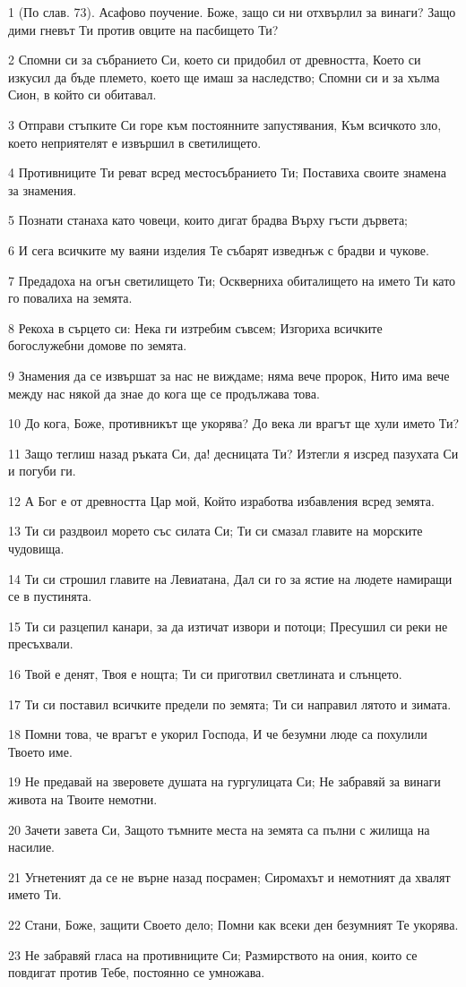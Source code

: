 \par 1 (По слав. 73). Асафово поучение. Боже, защо си ни отхвърлил за винаги? Защо дими гневът Ти против овците на пасбището Ти?
\par 2 Спомни си за събранието Си, което си придобил от древността, Което си изкусил да бъде племето, което ще имаш за наследство; Спомни си и за хълма Сион, в който си обитавал.
\par 3 Отправи стъпките Си горе към постоянните запустявания, Към всичкото зло, което неприятелят е извършил в светилището.
\par 4 Противниците Ти реват всред местосъбранието Ти; Поставиха своите знамена за знамения.
\par 5 Познати станаха като човеци, които дигат брадва Върху гъсти дървета;
\par 6 И сега всичките му ваяни изделия Те събарят изведнъж с брадви и чукове.
\par 7 Предадоха на огън светилището Ти; Оскверниха обиталището на името Ти като го повалиха на земята.
\par 8 Рекоха в сърцето си: Нека ги изтребим съвсем; Изгориха всичките богослужебни домове по земята.
\par 9 Знамения да се извършат за нас не виждаме; няма вече пророк, Нито има вече между нас някой да знае до кога ще се продължава това.
\par 10 До кога, Боже, противникът ще укорява? До века ли врагът ще хули името Ти?
\par 11 Защо теглиш назад ръката Си, да! десницата Ти? Изтегли я изсред пазухата Си и погуби ги.
\par 12 А Бог е от древността Цар мой, Който изработва избавления всред земята.
\par 13 Ти си раздвоил морето със силата Си; Ти си смазал главите на морските чудовища.
\par 14 Ти си строшил главите на Левиатана, Дал си го за ястие на людете намиращи се в пустинята.
\par 15 Ти си разцепил канари, за да изтичат извори и потоци; Пресушил си реки не пресъхвали.
\par 16 Твой е денят, Твоя е нощта; Ти си приготвил светлината и слънцето.
\par 17 Ти си поставил всичките предели по земята; Ти си направил лятото и зимата.
\par 18 Помни това, че врагът е укорил Господа, И че безумни люде са похулили Твоето име.
\par 19 Не предавай на зверовете душата на гургулицата Си; Не забравяй за винаги живота на Твоите немотни.
\par 20 Зачети завета Си, Защото тъмните места на земята са пълни с жилища на насилие.
\par 21 Угнетеният да се не върне назад посрамен; Сиромахът и немотният да хвалят името Ти.
\par 22 Стани, Боже, защити Своето дело; Помни как всеки ден безумният Те укорява.
\par 23 Не забравяй гласа на противниците Си; Размирството на ония, които се повдигат против Тебе, постоянно се умножава.

